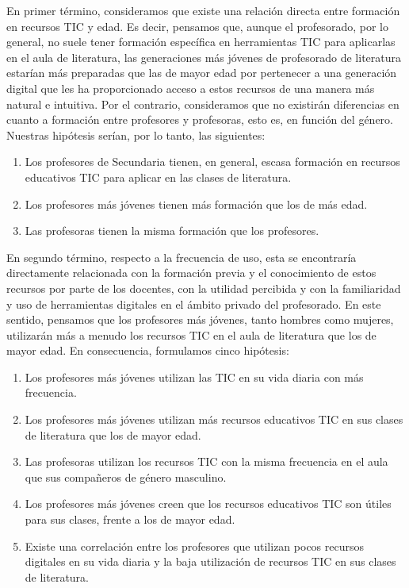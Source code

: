 \documentclass[spanish]{textolivre}
\begin{document}
En primer término, consideramos que existe una relación directa entre formación en recursos TIC y edad. Es decir, pensamos que, aunque el profesorado, por lo general, no suele tener formación específica en herramientas TIC para aplicarlas en el aula de literatura, las generaciones más jóvenes de profesorado de literatura estarían más preparadas que las de mayor edad por pertenecer a una generación digital que les ha proporcionado acceso a estos recursos de una manera más natural e intuitiva. Por el contrario, consideramos que no existirán diferencias en cuanto a formación entre profesores y profesoras, esto es, en función del género. Nuestras hipótesis serían, por lo tanto, las siguientes:

\begin{enumerate}[label={H\arabic*}]
    \item\label{H1} Los profesores de Secundaria tienen, en general, escasa formación en recursos educativos TIC para aplicar en las clases de literatura.
    \item\label{H2} Los profesores más jóvenes tienen más formación que los de más edad.
    \item\label{H3} Las profesoras tienen la misma formación que los profesores.
\end{enumerate}

En segundo término, respecto a la frecuencia de uso, esta se encontraría directamente relacionada con la formación previa y el conocimiento de estos recursos por parte de los docentes, con la utilidad percibida y con la familiaridad y uso de herramientas digitales en el ámbito privado del profesorado. En este sentido, pensamos que los profesores más jóvenes, tanto hombres como mujeres, utilizarán más a menudo los recursos TIC en el aula de literatura que los de mayor edad. En consecuencia, formulamos cinco hipótesis:

\begin{enumerate}[label={H\arabic*},resume]
     \item\label{H4} Los profesores más jóvenes utilizan las TIC en su vida diaria con más frecuencia.
     \item\label{H5} Los profesores más jóvenes utilizan más recursos educativos TIC en sus clases de literatura que los de mayor edad.
     \item\label{H6} Las profesoras utilizan los recursos TIC con la misma frecuencia en el aula que sus compañeros de género masculino.
     \item\label{H7} Los profesores más jóvenes creen que los recursos educativos TIC son útiles para sus clases, frente a los de mayor edad.
     \item\label{H8} Existe una correlación entre los profesores que utilizan pocos recursos digitales en su vida diaria y la baja utilización de recursos TIC en sus clases de literatura.
\end{enumerate}
\end{document}
